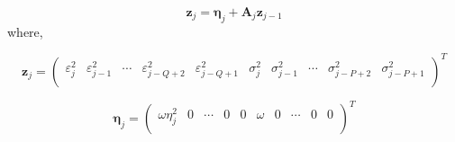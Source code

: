 \documentclass[10pt,a4paper,oneside]{article}
\providecommand{\DIFaddbegin}{} %
\providecommand{\DIFaddend}{} %
\providecommand{\DIFdelbegin}{} %
\providecommand{\DIFdelend}{} %
\newcommand{\DIFscaledelfig}{0.5}
\newlength{\DIFdelgraphicswidth} %
\newlength{\DIFdelgraphicsheight} %
\newcommand{\DIFaddincludegraphics}[2][]{{\color{blue}\fbox{\DIFOincludegraphics[#1]{#2}}}} %
\newcommand{\DIFdelincludegraphics}[2][]{%
\sbox{\DIFdelgraphicsbox}{\DIFOincludegraphics[#1]{#2}}%
\settoboxwidth{\DIFdelgraphicswidth}{\DIFdelgraphicsbox} %
\settoboxtotalheight{\DIFdelgraphicsheight}{\DIFdelgraphicsbox} %
\scalebox{\DIFscaledelfig}{%
\parbox[b]{\DIFdelgraphicswidth}{\usebox{\DIFdelgraphicsbox}\\[-\baselineskip] \rule{\DIFdelgraphicswidth}{0em}}\llap{\resizebox{\DIFdelgraphicswidth}{\DIFdelgraphicsheight}{%
\setlength{\unitlength}{\DIFdelgraphicswidth}%
\begin{picture}(1,1)%
\thicklines\linethickness{2pt} %
{\color[rgb]{1,0,0}\put(0,0){\framebox(1,1){}}}%
{\color[rgb]{1,0,0}\put(0,0){\line( 1,1){1}}}%
{\color[rgb]{1,0,0}\put(0,1){\line(1,-1){1}}}%
\end{picture}%
}\hspace*{3pt}}} %
} %
\DeclareRobustCommand{\DIFaddbegin}{\DIFOaddbegin \let\includegraphics\DIFaddincludegraphics} %
\DeclareRobustCommand{\DIFaddend}{\DIFOaddend \let\includegraphics\DIFOincludegraphics} %
\DeclareRobustCommand{\DIFdelbegin}{\DIFOdelbegin \let\includegraphics\DIFdelincludegraphics} %
\DeclareRobustCommand{\DIFdelend}{\DIFOaddend \let\includegraphics\DIFOincludegraphics} %
\begin{document}
\begin{equation}
    \mathbf{z}_j = \boldsymbol{\eta}_j + \mathbf{A}_j \mathbf{z}_{j - 1}
    \label{eq:markov_rep_garch}
\end{equation}
where,

\[
    \mathbf{z}_j =
    \DIFdelbegin %
\DIFdelend \DIFaddbegin \begin{pmatrix}
        \varepsilon_j^2 & \varepsilon_{j - 1}^2 & \cdots & \varepsilon_{j - Q + 2}^2 & \varepsilon_{j - Q + 1}^2 & \sigma^2_{j} & \sigma^2_{j - 1} & \cdots & \sigma^2_{j - P + 2} & \sigma^2_{j - P + 1} \\
    \end{pmatrix}\DIFaddend ^T
\]


\[
    \mathbf{\eta}_j =
    \DIFdelbegin %
\DIFdelend \DIFaddbegin \begin{pmatrix}
        \omega \eta_j^2 & 0 & \cdots & 0 & 0 & \omega & 0 & \cdots & 0 & 0 \\
    \end{pmatrix}\DIFaddend ^T
\]
\end{document}
